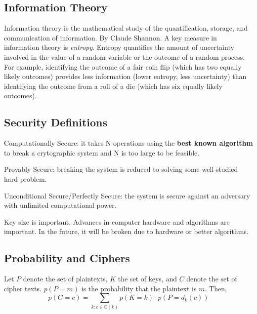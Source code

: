 \subsection{Information Theory}
Information theory is the mathematical study of the quantification, storage, and communication of information. By Claude Shannon. 
A key measure in information theory is \emph{entropy}. Entropy quantifies the amount of uncertainty involved in the value of a random variable or the outcome of a random process.
For example, identifying the outcome of a fair coin flip (which has two equally likely outcomes) provides less information (lower entropy, less uncertainty) than identifying the outcome from a roll of a die (which has six equally likely outcomes).


\subsection{Security Definitions}
\begin{defn}
    Computationally Secure: it takes N operations using the \textbf{best known algorithm} to break a crytographic system and N is too large to be feasible.
\end{defn}

\begin{defn}
    Provably Secure: breaking the system is reduced to solving some well-studied hard problem.
\end{defn}

\begin{defn}
    Unconditional Secure/Perfectly Secure: the system is secure against an adversary with unlimited computational power.
\end{defn}

Key size is important. Advances in computer hardware and algorithms are important. In the future, it will be broken due to hardware or better algorithms.

\subsection{Probability and Ciphers}

\begin{defn}
Let $P$ denote the set of plaintexts, $K$ the set of keys, and $C$ denote the set of cipher texts. $p(P=m)$ is the probability that the plaintext is $m$. Then,
\[
p(C=c) = \sum_{k: c\in \mathbb{C}(k)} p(K=k)\cdot p(P=d_k(c))
\]
\end{defn}

